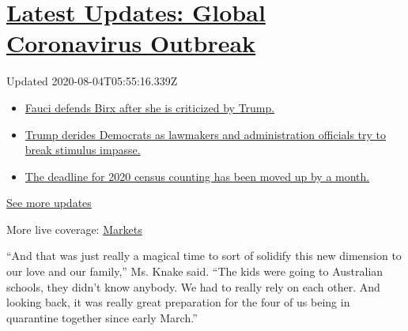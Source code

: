 \hypertarget{latest-updates-global-coronavirus-outbreak}{%
\section{\texorpdfstring{\href{https://www.nytimes.com/2020/08/03/world/coronavirus-covid-19.html?action=click\&pgtype=Article\&state=default\&region=MAIN_CONTENT_1\&context=storylines_live_updates}{Latest
Updates: Global Coronavirus
Outbreak}}{Latest Updates: Global Coronavirus Outbreak}}\label{latest-updates-global-coronavirus-outbreak}}

Updated 2020-08-04T05:55:16.339Z

\begin{itemize}
\tightlist
\item
  \href{https://www.nytimes.com/2020/08/03/world/coronavirus-covid-19.html?action=click\&pgtype=Article\&state=default\&region=MAIN_CONTENT_1\&context=storylines_live_updates\#link-4547638f}{Fauci
  defends Birx after she is criticized by Trump.}
\item
  \href{https://www.nytimes.com/2020/08/03/world/coronavirus-covid-19.html?action=click\&pgtype=Article\&state=default\&region=MAIN_CONTENT_1\&context=storylines_live_updates\#link-15e7f995}{Trump
  derides Democrats as lawmakers and administration officials try to
  break stimulus impasse.}
\item
  \href{https://www.nytimes.com/2020/08/03/world/coronavirus-covid-19.html?action=click\&pgtype=Article\&state=default\&region=MAIN_CONTENT_1\&context=storylines_live_updates\#link-e5a2cda}{The
  deadline for 2020 census counting has been moved up by a month.}
\end{itemize}

\href{https://www.nytimes.com/2020/08/03/world/coronavirus-covid-19.html?action=click\&pgtype=Article\&state=default\&region=MAIN_CONTENT_1\&context=storylines_live_updates}{See
more updates}

More live coverage:
\href{https://www.nytimes.com/live/2020/08/03/business/stock-market-today-coronavirus?action=click\&pgtype=Article\&state=default\&region=MAIN_CONTENT_1\&context=storylines_live_updates}{Markets}

``And that was just really a magical time to sort of solidify this new
dimension to our love and our family,'' Ms. Knake said. ``The kids were
going to Australian schools, they didn't know anybody. We had to really
rely on each other. And looking back, it was really great preparation
for the four of us being in quarantine together since early March.''

